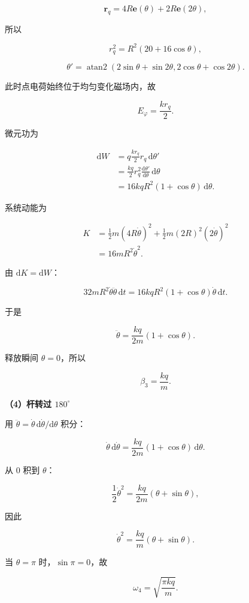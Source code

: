 \documentclass[12pt,a4paper,UTF8]{ctexart}
\begin{document}
\[\boldsymbol r_q=4R\boldsymbol e(\theta)+2R\boldsymbol e(2\theta),\]

所以

\[r_q^2=R^2(20+16\cos\theta), \tag{23}\]

\[\theta'=\operatorname{atan2}
\left(2\sin\theta+\sin2\theta,
2\cos\theta+\cos2\theta\right). \tag{24}\]

此时点电荷始终位于均匀变化磁场内，故

\[E_\varphi=\frac{kr_q}{2}.\]

微元功为

\[\begin{aligned}
\mathrm dW
&=q\frac{kr_q}{2}r_q\,\mathrm d\theta'\\
&=\frac{kq}{2}r_q^2\frac{\mathrm d\theta'}{\mathrm d\theta}\,\mathrm d\theta\\
&=16kqR^2(1+\cos\theta)\,\mathrm d\theta.
\end{aligned} \tag{25}\]

系统动能为

\[\begin{aligned}
K
&=\frac12m(4R\dot\theta)^2
+\frac12m(2R)^2(2\dot\theta)^2\\
&=16mR^2\dot\theta^2.
\end{aligned} \tag{26}\]

由 \(\mathrm dK=\mathrm dW\)：

\[32mR^2\dot\theta\ddot\theta\,\mathrm dt
=16kqR^2(1+\cos\theta)\dot\theta\,\mathrm dt.\]

于是

\[\boxed{
\ddot\theta=\frac{kq}{2m}(1+\cos\theta)
}. \tag{27}\]

释放瞬间 \(\theta=0\)，所以

\[\boxed{\beta_3=\frac{kq}{m}}. \tag{28}\]

\textbf{（4）杆转过 \(180^\circ\)}

用 \(\ddot\theta=\dot\theta\,\mathrm d\dot\theta/\mathrm d\theta\)
积分：

\[\dot\theta\,\mathrm d\dot\theta
=\frac{kq}{2m}(1+\cos\theta)\,\mathrm d\theta.\]

从 \(0\) 积到 \(\theta\)：

\[\frac12\dot\theta^2
=\frac{kq}{2m}(\theta+\sin\theta),\]

因此

\[\boxed{
\dot\theta^2=\frac{kq}{m}(\theta+\sin\theta)
}. \tag{29}\]

当 \(\theta=\pi\) 时，\(\sin\pi=0\)，故

\[\boxed{\omega_4=\sqrt{\frac{\pi kq}{m}}}. \tag{30}\]
\end{document}
